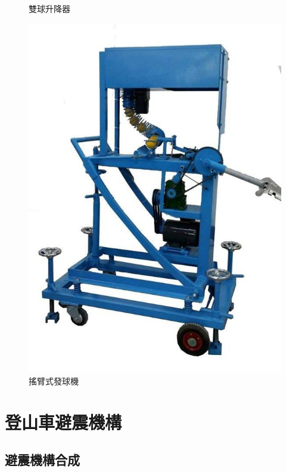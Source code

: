 \documentclass[14pt,a4paper]{report}  %
\newcommand{\fourteen}{\fontsize{14pt}{\baselineskip}\selectfont}%
\begin{document}
{\begin{figure}[H]
        \caption{雙球升降器} %
        \label{fig:scale} %
    \end{figure}
    \begin{figure}[H]
        \centering
        \includegraphics[scale=0.6]{搖臂式發球機.jpg} 
        \caption{搖臂式發球機} %
        \label{fig:scale} %
    \end{figure}
        \chapter{登山車避震機構}
      \section{避震機構合成}
      \fourteen {機構合成設計需求為騎乘姿勢改變時或遇到顛頗不整的路時仍能保持整體的平衡，即Anti-squat及Anti-rise的數值能在100%
}}
\end{document}
